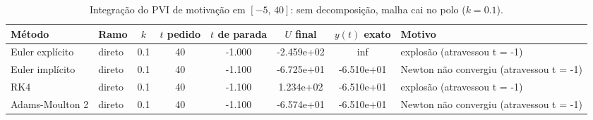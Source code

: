 \begin{table}[H]
    \centering
    \small
    \begin{tabular}{llcccccl}
        \hline
        Método & Ramo & $k$ & $t$ pedido & $t$ de parada & $U$ final & $y(t)$ exato & Motivo \\
        \hline
        Euler explícito & direto & 0.1 & 40 & -1.000 & -2.459e+02 & inf & explosão (atravessou t = -1) \\
        Euler implícito & direto & 0.1 & 40 & -1.100 & -6.725e+01 & -6.510e+01 & Newton não convergiu (atravessou t = -1) \\
        RK4 & direto & 0.1 & 40 & -1.100 & 1.234e+02 & -6.510e+01 & explosão (atravessou t = -1) \\
        Adams-Moulton 2 & direto & 0.1 & 40 & -1.100 & -6.574e+01 & -6.510e+01 & Newton não convergiu (atravessou t = -1) \\
        \hline
    \end{tabular}
    \caption{Integração do PVI de motivação em $[-5,\, 40]$: sem decomposição, malha cai no polo ($k = 0.1$).}
    \label{tab:m5_40_sd_cai_polo}
\end{table}
